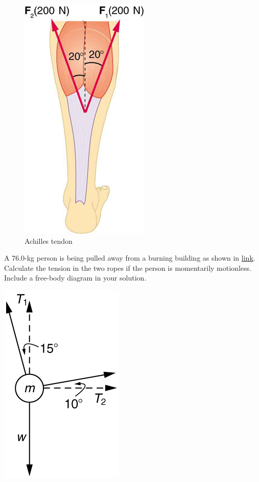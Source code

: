 \documentclass[
]{book}
\begin{document}
\begin{figure}
\hypertarget{import-auto-id2667995}{%
\centering
\includegraphics{images/Figure_04_07_04.jpg}
\caption{Achilles tendon}\label{import-auto-id2667995}
}
\end{figure}

\hypertarget{fs-id2953749}{}
\leavevmode{}%
A 76.0-kg person is being pulled away from a burning building as shown
in \protect\hyperlink{import-auto-id2677556}{link}. Calculate the
tension in the two ropes if the person is momentarily motionless.
Include a free-body diagram in your solution.

\leavevmode{}%
\includegraphics{images/Figure_04_07_07.jpg}
\end{document}
